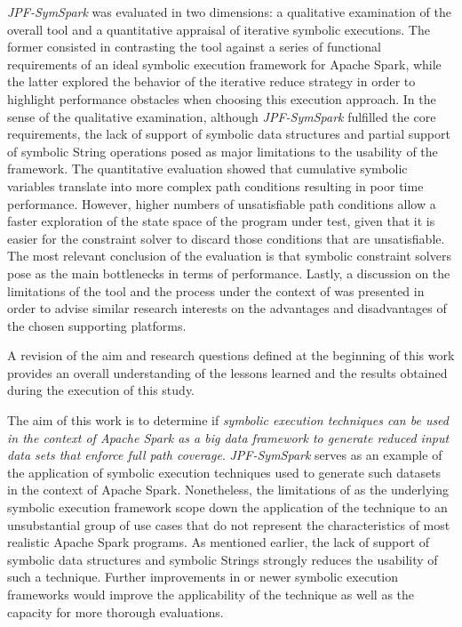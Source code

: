 \textit{JPF-SymSpark} was evaluated in two dimensions: a qualitative examination of the overall tool and a quantitative appraisal of iterative symbolic executions. The former consisted in contrasting the tool against a series of functional requirements of an ideal symbolic execution framework for Apache Spark, while the latter explored the behavior of the iterative reduce strategy in order to highlight performance obstacles when choosing this execution approach. In the sense of the qualitative examination, although \textit{JPF-SymSpark} fulfilled the core requirements, the lack of support of symbolic data structures and partial support of symbolic String operations posed as major limitations to the usability of the framework. The quantitative evaluation showed that cumulative symbolic variables translate into more complex path conditions resulting in poor time performance. However, higher numbers of unsatisfiable path conditions allow a faster exploration of the state space of the program under test, given that it is easier for the constraint solver to discard those conditions that are unsatisfiable. The most relevant conclusion of the evaluation is that symbolic constraint solvers pose as the main bottlenecks in terms of performance. Lastly, a discussion on the limitations of the tool and the process under the context of \jpf{} was presented in order to advise similar research interests on the advantages and disadvantages of the chosen supporting platforms.


A revision of the aim and research questions defined at the beginning of this work provides an overall understanding of the lessons learned and the results obtained during the execution of this study.

The aim of this work is to  determine if \textit{symbolic execution techniques can be used in the context of Apache Spark as a big data framework to generate reduced input data sets that enforce full path coverage}. \textit{JPF-SymSpark} serves as an example of the application of symbolic execution techniques used to generate such datasets in the context of Apache Spark. Nonetheless, the limitations of \spf{} as the underlying symbolic execution framework scope down the application of the technique to an unsubstantial group of use cases that do not represent the characteristics of most realistic Apache Spark programs. As mentioned earlier, the lack of support of symbolic data structures and symbolic Strings strongly reduces the usability of such a technique. Further improvements in \spf{} or newer symbolic execution frameworks would improve the applicability of the technique as well as the capacity for more thorough evaluations.

